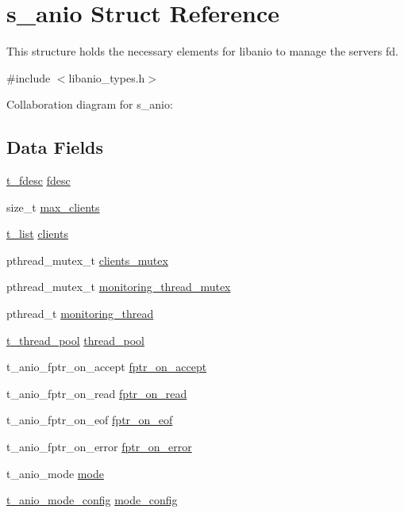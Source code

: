 \hypertarget{structs__anio}{}\section{s\+\_\+anio Struct Reference}
\label{structs__anio}


This structure holds the necessary elements for libanio to manage the server\textquotesingle{}s fd.  




{\ttfamily \#include $<$libanio\+\_\+types.\+h$>$}



Collaboration diagram for s\+\_\+anio\+:
\subsection*{Data Fields}
\begin{DoxyCompactItemize}
\item 
\hyperlink{structs__fdesc}{t\+\_\+fdesc} \hyperlink{structs__anio_a8f2299298072be288b2e8023ddb1876b}{fdesc}
\item 
size\+\_\+t \hyperlink{structs__anio_a63a323821e4c59f823cd9f7ccfc49f67}{max\+\_\+clients}
\item 
\hyperlink{structs__list}{t\+\_\+list} \hyperlink{structs__anio_aa18ac90a5592f8ce8d870cd2fa0ef9f2}{clients}
\item 
pthread\+\_\+mutex\+\_\+t \hyperlink{structs__anio_ad37ba794a80b637d4ff4f52696287d68}{clients\+\_\+mutex}
\item 
pthread\+\_\+mutex\+\_\+t \hyperlink{structs__anio_a5e6f96badcda7b3194416a2234a0473f}{monitoring\+\_\+thread\+\_\+mutex}
\item 
pthread\+\_\+t \hyperlink{structs__anio_ad87ae1e913300a5f18105cc5e9bcd991}{monitoring\+\_\+thread}
\item 
\hyperlink{structs__thread__pool}{t\+\_\+thread\+\_\+pool} \hyperlink{structs__anio_a2090eced07a64cca0f4a39e0e3928214}{thread\+\_\+pool}
\item 
t\+\_\+anio\+\_\+fptr\+\_\+on\+\_\+accept \hyperlink{structs__anio_a02d4a0107368dc5ebb180836f67129af}{fptr\+\_\+on\+\_\+accept}
\item 
t\+\_\+anio\+\_\+fptr\+\_\+on\+\_\+read \hyperlink{structs__anio_aca8e00d72ff1a420757122fe8328f9e5}{fptr\+\_\+on\+\_\+read}
\item 
t\+\_\+anio\+\_\+fptr\+\_\+on\+\_\+eof \hyperlink{structs__anio_af681ce20da5e7d7df16e5c7c3af6110e}{fptr\+\_\+on\+\_\+eof}
\item 
t\+\_\+anio\+\_\+fptr\+\_\+on\+\_\+error \hyperlink{structs__anio_a1ca9612c8081f66ed33e0824627f7262}{fptr\+\_\+on\+\_\+error}
\item 
t\+\_\+anio\+\_\+mode \hyperlink{structs__anio_a8103ffbbc1a816b3461f8b0c26c9c3ff}{mode}
\item 
\hyperlink{unionu__anio__mode__config}{t\+\_\+anio\+\_\+mode\+\_\+config} \hyperlink{structs__anio_ab8b074796a020765a00a9dd9b0c4d709}{mode\+\_\+config}
\end{DoxyCompactItemize}


